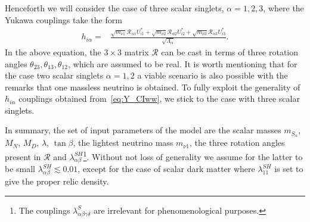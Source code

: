Henceforth
we will consider the case of three scalar singlets, $\alpha=1,2,3$,
where the Yukawa couplings take the form
\begin{align}
\label{eq:Y_CIww}
 h_{i\alpha}=&\frac{\sqrt{m_{\nu 1}}{\mathcal{R}}_{\alpha 1}U_{i1}^*+\sqrt{m_{\nu 2}}{\mathcal{R}}_{\alpha 2} U^{*}_{i2}+ \sqrt{m_{\nu 3}}{\mathcal{R}}_{\alpha 3} U^{*}_{i3}}{\sqrt{\Lambda_\alpha}}.
\end{align}
In the above equation, the $3\times3$ matrix
$\boldsymbol{\mathcal{R}}$ can be cast in terms of three rotation
angles $\theta_{23},\theta_{13},\theta_{12}$, which are assumed to be real. 
It is worth mentioning that for the case two scalar singlets
$\alpha=1,2$ a viable scenario is also possible with the remarks that
one massless neutrino is obtained. 
To fully exploit the generality of $h_{i\alpha}$ couplings obtained
from~\eqref{eq:Y_CIww}, we stick to the case with three scalar singlets.


In summary, the set of input parameters of the model are the scalar masses
$m_{S_\alpha}$, $M_N$, $M_D$, $\lambda$,
$\tan\beta$, the lightest neutrino mass $m_{\nu1}$, the three rotation 
angles present in $\boldsymbol{\mathcal{R}}$  
and $\lambda^{SH}_{\alpha\beta}$\footnote{The couplings $\lambda^{S}_{\alpha\beta\gamma\delta}$ are irrelevant for phenomenological purposes.}. Without not loss of generality we assume for the latter to be small $\lambda^{SH}_{\alpha\beta}\lesssim0.01$, except for the case of scalar dark matter where $\lambda^{SH}_{11}$ is set to give 
the proper relic density.

